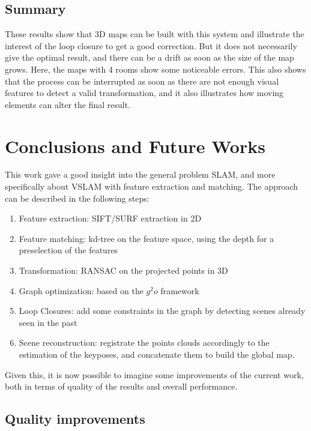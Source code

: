 \section{Summary}
These results show that 3D maps can be built with this system and illustrate the interest of the loop closure to get a good correction. But it does not necessarily  give the optimal result, and there can be a drift as soon as the size of the map grows. Here, the maps with 4 rooms show some noticeable errors. This also shows that the process can be interrupted as soon as there are not enough visual features to detect a valid transformation, and it also illustrates how moving elements can alter the final result.

\chapter{Conclusions and Future Works}
\label{chap:conclusion}

This work gave a good insight into the general problem \gls{SLAM}, and more specifically about \gls{VSLAM} with feature extraction and matching. The approach can be described in the following steps:
\begin{enumerate}
\item Feature extraction: \gls{SIFT}/\gls{SURF} extraction in 2D
\item Feature matching: kd-tree on the feature space, using the depth for a preselection of the features
\item Transformation: \gls{RANSAC} on the projected points in 3D
\item Graph optimization: based on the $g^2o$ framework
\item Loop Closures: add some constraints in the graph by detecting scenes already seen in the past
\item Scene reconstruction: registrate the points clouds accordingly to the estimation of the keyposes, and concatenate them to build the global map.
\end{enumerate}

Given this, it is now possible to imagine some improvements of the current work, both in terms of quality of the results and overall performance.

\section{Quality improvements}

